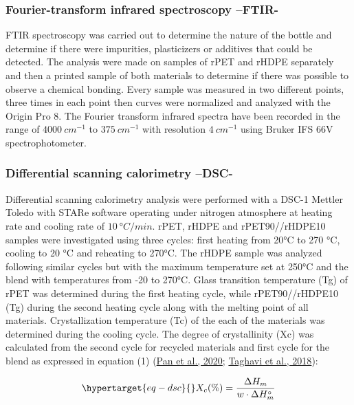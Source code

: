 \documentclass[
  12pt,
]{article}
\begin{document}
\hypertarget{fourier-transform-infrared-spectroscopy-ftir-}{%
\subsubsection{Fourier-transform infrared spectroscopy
--FTIR-}\label{fourier-transform-infrared-spectroscopy-ftir-}}

FTIR spectroscopy was carried out to determine the nature of the bottle
and determine if there were impurities, plasticizers or additives that
could be detected. The analysis were made on samples of rPET and rHDPE
separately and then a printed sample of both materials to determine if
there was possible to observe a chemical bonding. Every sample was
measured in two different points, three times in each point then curves
were normalized and analyzed with the Origin Pro 8. The Fourier
transform infrared spectra have been recorded in the range of
\(4000~cm^{-1}\) to \(375~cm^{-1}\) with resolution \(4~cm^{-1}\) using
Bruker IFS 66V spectrophotometer.

\hypertarget{differential-scanning-calorimetry-dsc-}{%
\subsubsection{Differential scanning calorimetry
--DSC-}\label{differential-scanning-calorimetry-dsc-}}

Differential scanning calorimetry analysis were performed with a DSC-1
Mettler Toledo with STARe software operating under nitrogen atmosphere
at heating rate and cooling rate of \(10~°C/min\). rPET, rHDPE and
rPET90//rHDPE10 samples were investigated using three cycles: first
heating from 20°C to 270 °C, cooling to 20 °C and reheating to 270°C.
The rHDPE sample was analyzed following similar cycles but with the
maximum temperature set at 250°C and the blend with temperatures from
-20 to 270°C. Glass transition temperature (Tg) of rPET was determined
during the first heating cycle, while rPET90//rHDPE10 (Tg) during the
second heating cycle along with the melting point of all materials.
Crystallization temperature (Tc) of the each of the materials was
determined during the cooling cycle. The degree of crystallinity (Xc)
was calculated from the second cycle for recycled materials and first
cycle for the blend as expressed in equation (1)
(\protect\hyperlink{ref-pan2020}{Pan et al., 2020};
\protect\hyperlink{ref-taghavi2018}{Taghavi et al., 2018}):

\begin{equation}\protect\hypertarget{eq-dsc}{}{
X_{c}(\%) = \frac{\Delta H_{m}}{w \cdot \Delta H_{m}^\circ}
}\label{eq-dsc}\end{equation}
\end{document}
